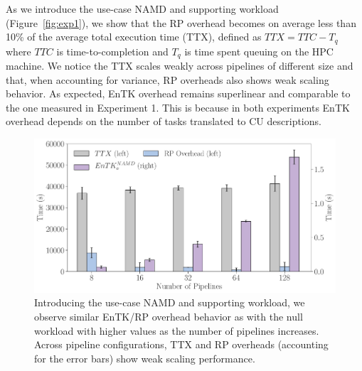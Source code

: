 
As we introduce the use-case NAMD and supporting workload
(Figure~\ref{fig:exp1}), we show that the RP overhead becomes
on average less than 10\% of the average total execution time (TTX), defined 
as \(TTX = TTC - T_q\) where \(TTC\) is time-to-completion and \(T_q\)
is time spent queuing on the HPC machine. We notice the TTX scales weakly
across pipelines of different size and that, when accounting for variance, RP
overheads also shows weak scaling behavior. As expected, EnTK overhead
remains superlinear and comparable to the one measured in Experiment 1. This
is because in both experiments EnTK overhead depends on the number of tasks
translated to CU descriptions.

\begin{figure}
  \centering
  \includegraphics[width=\columnwidth]{FIGURES/namd_workload_overheads.pdf}
  \caption{Introducing the use-case NAMD and supporting workload, we observe
  similar EnTK/RP overhead behavior as with the null workload with higher
  values as the number of pipelines increases. Across pipeline
  configurations, TTX and RP overheads (accounting for the error bars) show %
  weak scaling performance.}\label{fig:exp2}
\end{figure}


